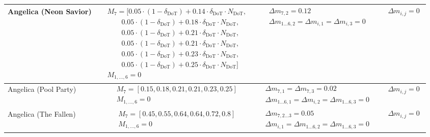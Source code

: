 \documentclass[twocolumn,10pt]{article}
\begin{document}
\begin{landscape}
\begin{longtable}{lccc}
Angelica (Neon Savior) &
$\begin{aligned}
& M_7 = [0.05 \cdot (1-\delta_{\text{DoT}}) + 0.14 \cdot \delta_{\text{DoT}} \cdot N_{\text{DoT}},\\
& \qquad 0.05 \cdot (1-\delta_{\text{DoT}}) + 0.18 \cdot \delta_{\text{DoT}} \cdot N_{\text{DoT}},\\
& \qquad 0.05 \cdot (1-\delta_{\text{DoT}}) + 0.21 \cdot \delta_{\text{DoT}} \cdot N_{\text{DoT}},\\
& \qquad 0.05 \cdot (1-\delta_{\text{DoT}}) + 0.21 \cdot \delta_{\text{DoT}} \cdot N_{\text{DoT}},\\
& \qquad 0.05 \cdot (1-\delta_{\text{DoT}}) + 0.23 \cdot \delta_{\text{DoT}} \cdot N_{\text{DoT}},\\
& \qquad 0.05 \cdot (1-\delta_{\text{DoT}}) + 0.25 \cdot \delta_{\text{DoT}} \cdot N_{\text{DoT}}] \\
& M_{1,\dots,6} = 0
\end{aligned}$ &
$\begin{aligned}
& \Delta m_{7,2} = 0.12 \\
& \Delta m_{1\dots6, 2} = \Delta m_{i,1} = \Delta m_{i,3} = 0
\end{aligned}$ &
$\begin{aligned}
& \Delta m_{i,j} = 0
\end{aligned}$ \\
\midrule

Angelica (Pool Party) &
$\begin{aligned}
& M_7 = [0.15, 0.18, 0.21, 0.21, 0.23, 0.25] \\
& M_{1,\dots,6} = 0
\end{aligned}$ &
$\begin{aligned}
& \Delta m_{7,1} = \Delta m_{7,3} = 0.02 \\
& \Delta m_{1\dots6, 1} = \Delta m_{i,2} = \Delta m_{1\dots6, 3} = 0
\end{aligned}$ &
$\begin{aligned}
& \Delta m_{i,j} = 0
\end{aligned}$ \\
\midrule

Angelica (The Fallen) &
$\begin{aligned}
& M_7 = [0.45, 0.55, 0.64, 0.64, 0.72, 0.8] \\
& M_{1,\dots,6} = 0
\end{aligned}$ &
$\begin{aligned}
& \Delta m_{7,2\dots3} = 0.05 \\
& \Delta m_{i,1} = \Delta m_{1\dots6, 2} = \Delta m_{1\dots6, 3} = 0
\end{aligned}$ &
$\begin{aligned}
& \Delta m_{i,j} = 0
\end{aligned}$ \\
\midrule


\end{longtable}
\end{landscape}
\end{document}
